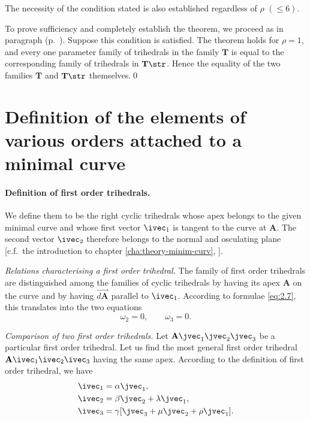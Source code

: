 The necessity of the condition stated is also established regardless of $\rho$ $(\le 6)$.

To prove sufficiency and completely establish the theorem, we proceed as in paragraph  (p.~\pageref{sec:6}). Suppose this condition is satisfied. The theorem holds for $\rho=1$, and every one parameter family of trihedrals in the family $\mathbf{T}$ is equal to the corresponding family of trihedrals in $\mathbf{T}\str$. Hence the equality of the two families $\mathbf{T}$ and $\mathbf{T}\str$ themselves.\qed

\section{Definition of the elements of various orders attached to a minimal curve}
\label{sec:defin-elem-vari}

\paragraph{Definition of first order trihedrals.}
\label{sec:27}
We define them to be the right cyclic trihedrals whose apex belongs to the given minimal curve and whose first vector $\ivec_{1}$ is tangent to the curve at $\mathbf{A}$. The second vector $\ivec_{2}$ therefore belongs to the normal and osculating plane [c.f.~the introduction to chapter \ref{cha:theory-minim-curv}, ].

\somespace

\emph{Relations characterising a first order trihedral.} The family of first order trihedrals are distinguished among the families of cyclic trihedrals by having its apex $\mathbf{A}$ on the curve and by having $\overrightarrow{d\mathbf{A}}$ parallel to $\ivec_{1}$. According to formulae \eqref{eq:2.7}, this translates into the two equations
\begin{equation}
  \label{eq:2.10}
  \omega_{2}=0,\qquad\omega_{3}=0.
\end{equation}

\somespace

\emph{Comparison of two first order trihedrals.} Let $\mathbf{A}\jvec_{1}\jvec_{2}\jvec_{3}$ be a particular first order trihedral. Let us find the most general first order trihedral $\mathbf{A}\ivec_{1}\ivec_{2}\ivec_{3}$ having the same apex. According to the definition of first order trihedral, we have
\begin{align*}
  \ivec_{1}&=\alpha\jvec_{1},\\
  \ivec_{2}&=\beta\jvec_{2}+\lambda\jvec_{1},\\
  \ivec_{3}&=\gamma[\jvec_{3}+\mu\jvec_{2}+\rho\jvec_{1}].
\end{align*}

